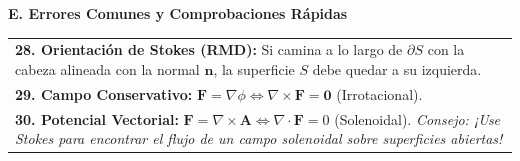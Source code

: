 \documentclass[10pt, landscape, twocolumn]{article}
\begin{document}
\vspace{0.6em}
{\color{themeblue}\normalsize\bfseries E. Errores Comunes y Comprobaciones Rápidas} \par
\vspace{-0.2em}
\begin{tabularx}{\linewidth}{|X|}
\hline
\textbf{28. Orientación de Stokes (RMD):} Si camina a lo largo de $\partial S$ con la cabeza alineada con la normal $\mathbf{n}$, la superficie $S$ debe quedar a su izquierda. \\
\textbf{29. Campo Conservativo:} $\mathbf{F} = \nabla \phi \iff \nabla \times \mathbf{F} = \mathbf{0}$ (Irrotacional). \\
\textbf{30. Potencial Vectorial:} $\mathbf{F} = \nabla \times \mathbf{A} \iff \nabla \cdot \mathbf{F} = 0$ (Solenoidal). \textit{Consejo: ¡Use Stokes para encontrar el flujo de un campo solenoidal sobre superficies abiertas!} \\
\hline
\end{tabularx}
\end{document}
